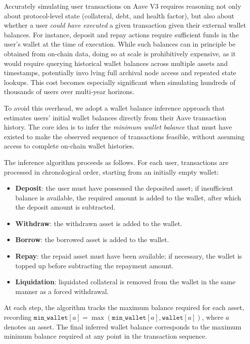 \documentclass[manuscript,screen,review]{acmart}
\begin{document}
Accurately simulating user transactions on Aave V3 requires reasoning not only about protocol-level state (collateral, debt, and health factor), but also about whether a user \emph{could have executed} a given transaction given their external wallet balances. For instance, deposit and repay actions require sufficient funds in the user’s wallet at the time of execution. While such balances can in principle be obtained from on-chain data, doing so at scale is prohibitively expensive, as it would require querying historical wallet balances across multiple assets and timestamps, potentially invo
lving full archival node access and repeated state lookups. This cost becomes especially significant when simulating hundreds of thousands of users over multi-year horizons.

To avoid this overhead, we adopt a wallet balance inference approach that estimates users’ initial wallet balances directly from their Aave transaction history. The core idea is to infer the \emph{minimum wallet balance} that must have existed to make the observed sequence of transactions feasible, without assuming access to complete on-chain wallet histories.

The inference algorithm proceeds as follows. For each user, transactions are processed in chronological order, starting from an initially empty wallet:
\begin{itemize}
    \item \textbf{Deposit}: the user must have possessed the deposited asset; if insufficient balance is available, the required amount is added to the wallet, after which the deposit amount is subtracted.
    \item \textbf{Withdraw}: the withdrawn asset is added to the wallet.
    \item \textbf{Borrow}: the borrowed asset is added to the wallet.
    \item \textbf{Repay}: the repaid asset must have been available; if necessary, the wallet is topped up before subtracting the repayment amount.
    \item \textbf{Liquidation}: liquidated collateral is removed from the wallet in the same manner as a forced withdrawal.
\end{itemize}

At each step, the algorithm tracks the maximum balance required for each asset, recording $\texttt{min\_wallet}[a] = \max(\texttt{min\_wallet}[a], \texttt{wallet}[a])$, where $a$ denotes an asset. The final inferred wallet balance corresponds to the maximum minimum balance required at any point in the transaction sequence.
\end{document}
